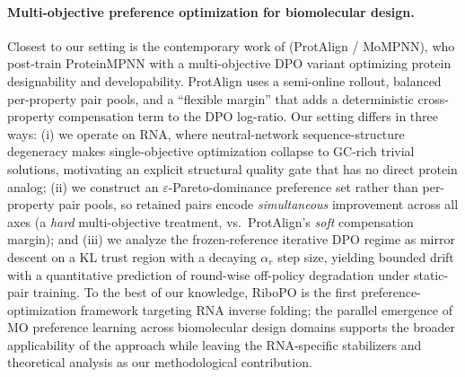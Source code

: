 \paragraph{Multi-objective preference optimization for biomolecular design.}
Closest to our setting is the contemporary work of \citet{hou2026protalign} (ProtAlign / MoMPNN), who post-train ProteinMPNN with a multi-objective DPO variant \citep{zhou2023beyond} optimizing protein designability and developability. ProtAlign uses a semi-online rollout, balanced per-property pair pools, and a ``flexible margin'' that adds a deterministic cross-property compensation term to the DPO log-ratio. Our setting differs in three ways: (i) we operate on RNA, where neutral-network sequence-structure degeneracy makes single-objective optimization collapse to GC-rich trivial solutions, motivating an explicit structural quality gate that has no direct protein analog; (ii) we construct an $\varepsilon$-Pareto-dominance preference set rather than per-property pair pools, so retained pairs encode \emph{simultaneous} improvement across all axes (a \emph{hard} multi-objective treatment, vs.\ ProtAlign's \emph{soft} compensation margin); and (iii) we analyze the frozen-reference iterative DPO regime as mirror descent on a KL trust region with a decaying $\alpha_r$ step size, yielding bounded drift with a quantitative prediction of round-wise off-policy degradation under static-pair training. To the best of our knowledge, RiboPO is the first preference-optimization framework targeting RNA inverse folding; the parallel emergence of MO preference learning across biomolecular design domains \citep{hou2026protalign,xue2025improving,rong2025enerbridge} supports the broader applicability of the approach while leaving the RNA-specific stabilizers and theoretical analysis as our methodological contribution.